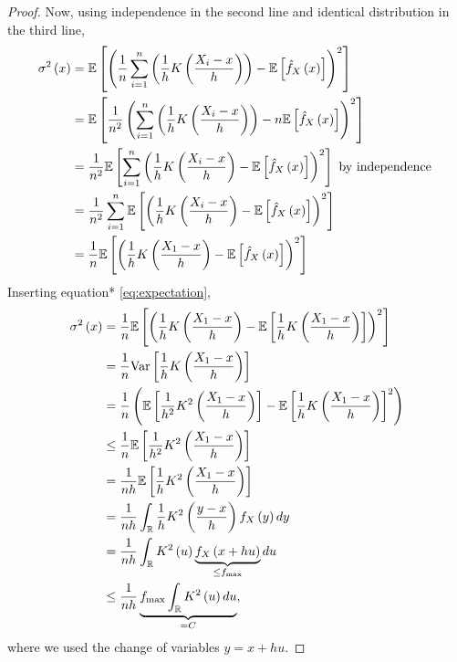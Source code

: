 \begin{proof}
  Now, using independence in the second line and identical distribution in the
  third line,
  \begin{equation*}
    \begin{split}
      \sigma^2\left(x\right) & = \mathbb{E}\left[\left(\frac{1}{n} \sum_{i=1}^n \left(\frac{1}{h} K\left(\frac{X_i-x}{h}\right)\right) - \mathbb{E}\left[\hat{f}_X \left(x\right)\right]\right)^2\right]                   \\
                     & =\mathbb{E}\left[\frac{1}{n^2}\left(\sum_{i=1}^n \left(\frac{1}{h} K\left(\frac{X_i-x}{h}\right)\right)-n\mathbb{E}\left[\hat{f}_X \left(x\right)\right]\right)^2\right]                    \\
                     & =\frac{1}{n^2}\mathbb{E}\left[\sum_{i=1}^n \left(\frac{1}{h} K\left(\frac{X_i-x}{h}\right)-\mathbb{E}\left[\hat{f}_X \left(x\right)\right]\right)^2\right] \text{ by independence } \\
                     & =\frac{1}{n^2} \sum_{i=1}^n\mathbb{E}\left[ \left(\frac{1}{h} K\left(\frac{X_i-x}{h}\right) - \mathbb{E}\left[\hat{f}_X \left(x\right)\right]\right)^2\right]                       \\
                     & = \frac{1}{n} \mathbb{E}\left[\left( \frac{1}{h} K\left(\frac{X_1-x}{h}\right)- \mathbb{E}\left[\hat{f}_X \left(x\right)\right]\right)^2\right]
    \end{split}
  \end{equation*}
  Inserting equation* \ref{eq:expectation},
  \begin{equation*}
    \begin{split}
      \sigma^2\left(x\right) & = \frac{1}{n} \mathbb{E}\left[\left( \frac{1}{h} K\left(\frac{X_1-x}{h}\right) - \mathbb{E}\left[\frac{1}{h} K\left(\frac{X_1-x}{h}\right)\right]\right)^2\right]     \\
                     & = \frac{1}{n}\mathrm{Var}\left[\frac{1}{h} K\left(\frac{X_1-x}{h}\right)\right]                                                        \\
                     & = \frac{1}{n}\left( \mathbb{E}\left[\frac{1}{h^2} K^2\left(\frac{X_1-x}{h}\right) \right] - \mathbb{E}\left[\frac{1}{h} K\left(\frac{X_1-x}{h}\right)\right]^2\right) \\
                     & \leq \frac{1}{n} \mathbb{E}\left[\frac{1}{h^2} K^2\left(\frac{X_1-x}{h}\right) \right]                                                 \\
                     & =\frac{1}{nh} \mathbb{E}\left[\frac{1}{h} K^2\left(\frac{X_1-x}{h}\right) \right]                                                      \\
                     & =\frac{1}{nh} \int_{\mathbb{R}} \frac{1}{h} K^2\left(\frac{y-x}{h}\right) f_X\left(y\right)dy                                             \\
                     & = \frac{1}{nh} \int_{\mathbb{R}} K^2\left(u\right) \underbrace{f_X\left(x+h u\right)}_{\leq f_{\max}} du                                  \\
                     & \leq \frac{1}{nh} \underbrace{f_{\max} \int_{\mathbb{R}} K^2\left(u\right) du}_{=C},
    \end{split}
  \end{equation*}
  where we used the change of variables $y=x+hu$.
\end{proof}

